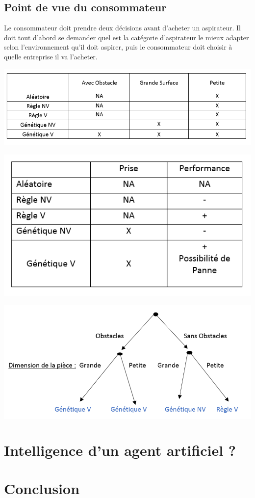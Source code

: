 \documentclass[12pt]{article}
\begin{document}
\subsection{Point de vue du consommateur}
\justify
Le consommateur doit prendre deux décisions avant d'acheter un aspirateur. Il doit tout d'abord se demander quel est la catégorie d'aspirateur le mieux adapter selon l'environnement qu'il doit aspirer, puis le consommateur doit choisir à quelle entreprise il va l'acheter. 
\begin{center}
	\includegraphics[scale=0.85]{Consom1}
\end{center}
\begin{center}
	\includegraphics[scale=0.85]{Consom2}
\end{center}
\begin{center}
	\includegraphics[scale=0.85]{Consom3}
\end{center}

\section{Intelligence d'un agent artificiel ? }

\section{Conclusion}
\end{document}
